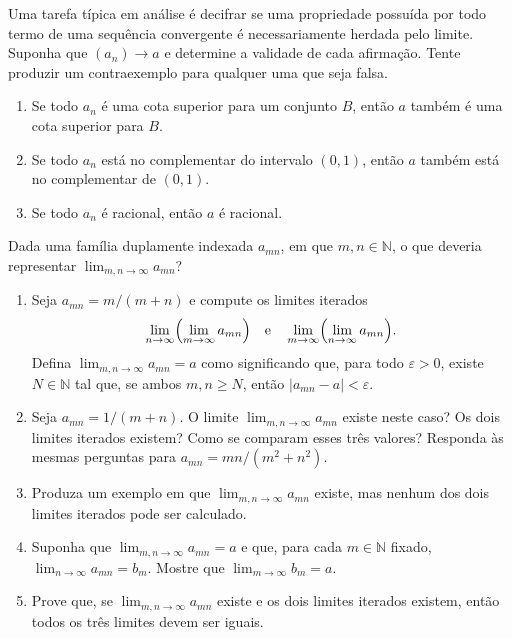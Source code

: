 \begin{exercise}\label{ex:2-3-12}
Uma tarefa típica em análise é decifrar se uma propriedade possuída por todo termo de uma sequência convergente é necessariamente herdada pelo limite. Suponha que $(a_n) \to a$ e determine a validade de cada afirmação. Tente produzir um contraexemplo para qualquer uma que seja falsa.
\begin{enumerate}[label=(\alph*)]
\item Se todo $a_n$ é uma cota superior para um conjunto $B$, então $a$ também é uma cota superior para $B$.
\item Se todo $a_n$ está no complementar do intervalo $(0, 1)$, então $a$ também está no complementar de $(0, 1)$.
\item Se todo $a_n$ é racional, então $a$ é racional.
\end{enumerate}
\end{exercise}

\begin{exercise}\label{ex:2-3-13}
Dada uma família duplamente indexada $a_{mn}$, em que $m, n \in \mathbb{N}$, o que deveria representar $\displaystyle \lim_{m,n \to \infty} a_{mn}$?
\begin{enumerate}[label=(\alph*)]
\item Seja $a_{mn} = m/(m + n)$ e compute os limites iterados
\[
\lim_{n \to \infty} \Bigl( \lim_{m \to \infty} a_{mn} \Bigr) \quad \text{e} \quad
\lim_{m \to \infty} \Bigl( \lim_{n \to \infty} a_{mn} \Bigr).
\]
Defina $\displaystyle \lim_{m,n \to \infty} a_{mn} = a$ como significando que, para todo $\varepsilon > 0$, existe $N \in \mathbb{N}$ tal que, se ambos $m, n \geq N$, então $|a_{mn} - a| < \varepsilon$.
\item Seja $a_{mn} = 1/(m + n)$. O limite $\displaystyle \lim_{m,n \to \infty} a_{mn}$ existe neste caso? Os dois limites iterados existem? Como se comparam esses três valores? Responda às mesmas perguntas para $a_{mn} = mn/(m^2 + n^2)$.
\item Produza um exemplo em que $\displaystyle \lim_{m,n \to \infty} a_{mn}$ existe, mas nenhum dos dois limites iterados pode ser calculado.
\item Suponha que $\displaystyle \lim_{m,n \to \infty} a_{mn} = a$ e que, para cada $m \in \mathbb{N}$ fixado, $\displaystyle \lim_{n \to \infty} a_{mn} = b_m$. Mostre que $\displaystyle \lim_{m \to \infty} b_m = a$.
\item Prove que, se $\displaystyle \lim_{m,n \to \infty} a_{mn}$ existe e os dois limites iterados existem, então todos os três limites devem ser iguais.
\end{enumerate}
\end{exercise}


